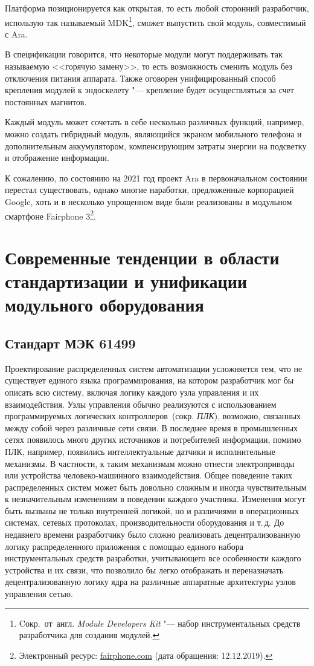 Платформа позиционируется как открытая, то есть любой сторонний разработчик, использую так называемый MDK\footnote{Cокр.~от~англ. \textit{Module Developers Kit} "--- набор инструментальных средств разработчика для создания модулей.}, сможет выпустить свой модуль, совместимый с Ara.

В спецификации говорится, что некоторые модули могут поддерживать так называемую <<горячую замену>>, то есть возможность сменить модуль без отключения питания аппарата. Также оговорен унифицированный способ крепления модулей к эндоскелету "--- крепление будет осуществляться за счет постоянных магнитов.

Каждый модуль может сочетать в себе несколько различных функций, например, можно создать гибридный модуль, являющийся экраном мобильного телефона и дополнительным аккумулятором, компенсирующим затраты энергии на подсветку и отображение информации.

К сожалению, по состоянию на 2021 год проект Ara в первоначальном состоянии перестал существовать, однако многие наработки, предложенные корпорацией Google, хоть и в несколько упрощенном виде были реализованы в модульном смартфоне Fairphone 3\footnote{Электронный ресурс: {\small\url{fairphone.com}} (дата обращения: 12.12.2019).}.

\section{Современные тенденции в области стандартизации и унификации модульного оборудования}

\subsection{Стандарт МЭК 61499}

Проектирование распределенных систем автоматизации усложняется тем, что не существует единого языка программирования, на котором разработчик мог бы описать всю систему, включая логику каждого узла управления и их взаимодействия. Узлы управления обычно реализуются с использованием программируемых логических контроллеров~(сокр. \textit{ПЛК}), возможно, связанных между собой через различные сети связи. В последнее время в промышленных сетях появилось много других источников и потребителей информации, помимо ПЛК, например, появились интеллектуальные датчики и исполнительные механизмы. В частности, к таким механизмам можно отнести электроприводы или устройства человеко-машинного взаимодействия. Общее поведение таких распределенных систем может быть довольно сложным и иногда чувствительным к незначительным изменениям в поведении каждого участника. Изменения могут быть вызваны не только внутренней логикой, но и различиями в операционных системах, сетевых протоколах, производительности оборудования и т.\,д. До недавнего времени разработчику было сложно реализовать децентрализованную логику распределенного приложения с помощью единого набора инструментальных средств разработки, учитывающего все особенности каждого устройства и их связи, что позволило бы легко отображать и переназначать децентрализованную логику ядра на различные аппаратные архитектуры узлов управления сетью.

